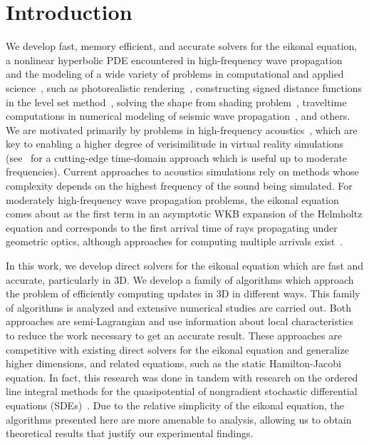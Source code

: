 \documentclass[smallcondensed]{svjour3}
\begin{document}
\section{Introduction}\label{sec:introduction}

We develop fast, memory efficient, and accurate solvers for the
eikonal equation, a nonlinear hyperbolic PDE encountered in
high-frequency wave propagation~\cite{engquist2003computational} and
the modeling of a wide variety of problems in computational and
applied science~\cite{sethian1999level}, such as photorealistic
rendering~\cite{ihrke2007eikonal}, constructing signed distance
functions in the level set method~\cite{osher2006level}, solving the
shape from shading
problem~\cite{kimmel2001optimal,prados2006shape,durou2008numerical},
traveltime computations in numerical modeling of seismic wave
propagation~\cite{sethian19993,popovici20023,kim20023,van1991upwind,vidale1990finite},
and others. We are motivated primarily by problems in high-frequency
acoustics~\cite{prislan2016ray}, which are key to enabling a higher
degree of verisimilitude in virtual reality simulations
(see~\cite{raghuvanshi2014parametric,raghuvanshi2018parametric} for a
cutting-edge time-domain approach which is useful up to moderate
frequencies). Current approaches to acoustics simulations rely on
methods whose complexity depends on the highest frequency of the sound
being simulated. For moderately high-frequency wave propagation
problems, the eikonal equation comes about as the first term in an
asymptotic WKB expansion of the Helmholtz equation and corresponds to
the first arrival time of rays propagating under geometric optics,
although approaches for computing multiple arrivals
exist~\cite{fomel2002fast}.

In this work, we develop direct solvers for the eikonal equation which
are fast and accurate, particularly in 3D. We develop a family of
algorithms which approach the problem of efficiently computing updates
in 3D in different ways. This family of algorithms is analyzed and
extensive numerical studies are carried out. Both approaches are
semi-Lagrangian and use information about local characteristics to
reduce the work necessary to get an accurate result. These approaches
are competitive with existing direct solvers for the eikonal equation
and generalize higher dimensions, and related equations, such as the
static Hamilton-Jacobi equation. In fact, this research was done in
tandem with research on the ordered line integral methods for the
quasipotential of nongradient stochastic differential equations
(SDEs)~\cite{dahiya2017ordered,dahiya2018ordered,yang2019computing}.
Due to the relative simplicity of the eikonal equation, the algorithms
presented here are more amenable to analysis, allowing us to obtain
theoretical results that justify our experimental findings.
\end{document}
